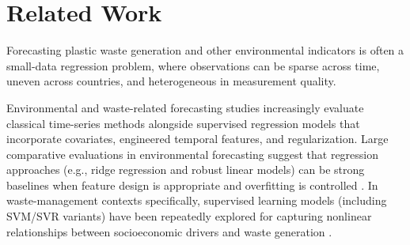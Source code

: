 \section{Related Work}

Forecasting plastic waste generation and other environmental indicators is often a small-data regression problem, where observations can be sparse across time, uneven across countries, and heterogeneous in measurement quality.

Environmental and waste-related forecasting studies increasingly evaluate classical time-series methods alongside supervised regression models that incorporate covariates, engineered temporal features, and regularization. Large comparative evaluations in environmental forecasting suggest that regression approaches (e.g., ridge regression and robust linear models) can be strong baselines when feature design is appropriate and overfitting is controlled \cite{effrosynidis2023time}. In waste-management contexts specifically, supervised learning models (including SVM/SVR variants) have been repeatedly explored for capturing nonlinear relationships between socioeconomic drivers and waste generation \cite{abbasi2013forecasting}.

